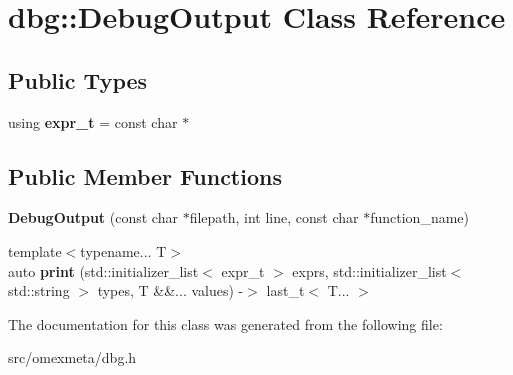 \hypertarget{classdbg_1_1DebugOutput}{}\section{dbg\+:\+:Debug\+Output Class Reference}
\label{classdbg_1_1DebugOutput}
\subsection*{Public Types}
\begin{DoxyCompactItemize}
\item 
\mbox{\label{classdbg_1_1DebugOutput_a5d9b38d5b9276cb584c0e20e9b1a2045}} 
using {\bfseries expr\+\_\+t} = const char $\ast$
\end{DoxyCompactItemize}
\subsection*{Public Member Functions}
\begin{DoxyCompactItemize}
\item 
\mbox{\label{classdbg_1_1DebugOutput_a7bb0378758aa1006e2423eff57ee36a2}} 
{\bfseries Debug\+Output} (const char $\ast$filepath, int line, const char $\ast$function\+\_\+name)
\item 
\mbox{\label{classdbg_1_1DebugOutput_aa135787802db4a6b0b4eb185185e13ca}} 
{\footnotesize template$<$typename... T$>$ }\\auto {\bfseries print} (std\+::initializer\+\_\+list$<$ expr\+\_\+t $>$ exprs, std\+::initializer\+\_\+list$<$ std\+::string $>$ types, T \&\&... values) -\/$>$ last\+\_\+t$<$ T... $>$
\end{DoxyCompactItemize}


The documentation for this class was generated from the following file\+:\begin{DoxyCompactItemize}
\item 
src/omexmeta/dbg.\+h\end{DoxyCompactItemize}
